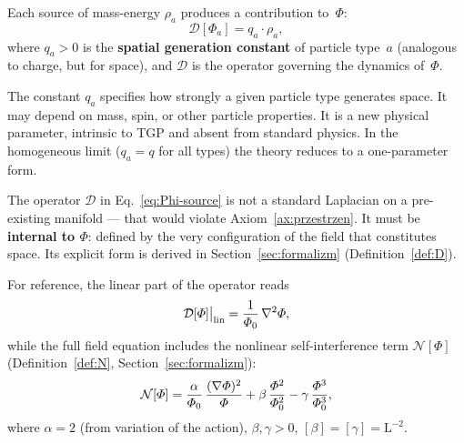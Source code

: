 \begin{axiom}\label{ax:zrodlo}
Each source of mass-energy $\rho_a$ produces a contribution to~$\Phi$:
\begin{equation}\label{eq:Phi-source}
    \mathcal{D}[\Phi_a] = q_a \cdot \rho_a,
\end{equation}
where $q_a > 0$ is the \textbf{spatial generation constant} of
particle type~$a$ (analogous to charge, but for space), and
$\mathcal{D}$ is the operator governing the dynamics of~$\Phi$.
\end{axiom}

\begin{remark}
The constant $q_a$ specifies how strongly a given particle type
generates space.  It may depend on mass, spin, or other particle
properties.  It is a new physical parameter, intrinsic to TGP and
absent from standard physics.  In the homogeneous limit ($q_a = q$
for all types) the theory reduces to a one-parameter form.
\end{remark}

\begin{remark}\label{rem:D-natura}
The operator $\mathcal{D}$ in Eq.~\eqref{eq:Phi-source} is not a
standard Laplacian on a pre-existing manifold --- that would violate
Axiom~\ref{ax:przestrzen}.  It must be \textbf{internal to $\Phi$}:
defined by the very configuration of the field that constitutes
space.  Its explicit form is derived in Section~\ref{sec:formalizm}
(Definition~\ref{def:D}).

For reference, the linear part of the operator reads
\begin{equation}\label{eq:D-preview}
  \mathcal{D}[\varPhi]\big|_{\mathrm{lin}}
  = \frac{1}{\varPhi_0}\,\nabla^2\varPhi,
\end{equation}
while the full field equation includes the nonlinear
self-interference term $\mathcal{N}[\Phi]$
(Definition~\ref{def:N}, Section~\ref{sec:formalizm}):
\begin{equation}\label{eq:N-preview}
  \mathcal{N}[\varPhi]
  = \frac{\alpha}{\varPhi_0}\,\frac{(\nabla\varPhi)^2}{\varPhi}
  + \beta\,\frac{\varPhi^2}{\varPhi_0^2}
  - \gamma\,\frac{\varPhi^3}{\varPhi_0^3},
\end{equation}
where $\alpha = 2$ (from variation of the action),
$\beta, \gamma > 0$, $[\beta] = [\gamma] = \mathrm{L}^{-2}$.
\end{remark}

